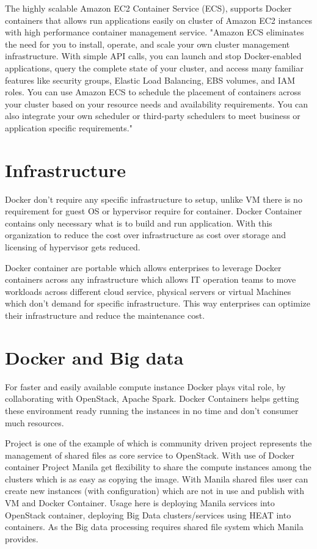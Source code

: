 \documentclass[9pt,twocolumn,twoside]{styles/osajnl}
\begin{document}
The highly scalable Amazon EC2 Container Service (ECS), supports Docker containers that allows run applications easily on cluster of Amazon EC2 instances with high performance container management service. "Amazon ECS eliminates the need for you to install, operate, and scale your own cluster management infrastructure. With simple API calls, you can launch and stop Docker-enabled applications, query the complete state of your cluster, and access many familiar features like security groups, Elastic Load Balancing, EBS volumes, and IAM roles. You can use Amazon ECS to schedule the placement of containers across your cluster based on your resource needs and availability requirements. You can also integrate your own scheduler or third-party schedulers to meet business or application specific requirements."\cite{ECS} 

\section{Infrastructure}
Docker don't require any specific infrastructure to setup, unlike VM there is no requirement for guest OS or hypervisor require for container. Docker Container contains only necessary what is to build and run application. With this organization to reduce the cost over infrastructure as cost over storage and licensing of hypervisor gets reduced.

Docker container are portable which allows enterprises to leverage Docker containers across any infrastructure which allows IT operation teams to move workloads across different cloud service, physical servers or virtual Machines which don't demand for specific infrastructure. This way enterprises can optimize their infrastructure and reduce the maintenance cost.

\section{Docker and Big data}
For faster and easily available compute instance Docker plays vital role, by collaborating with OpenStack, Apache Spark. Docker Containers helps getting these environment ready running the instances in no time and don't consumer much resources.

Project is one of the example of which is community driven project represents the management of shared files as core service to OpenStack. With use of Docker container Project Manila get flexibility to share the compute instances among the clusters which is as easy as copying the image. With Manila shared files user can create new instances (with configuration) which are not in use and publish with VM and Docker Container. Usage here is deploying Manila services into OpenStack container, deploying Big Data clusters/services using HEAT into containers. As the Big data processing requires shared file system which Manila provides.\cite{Manila}
\end{document}

